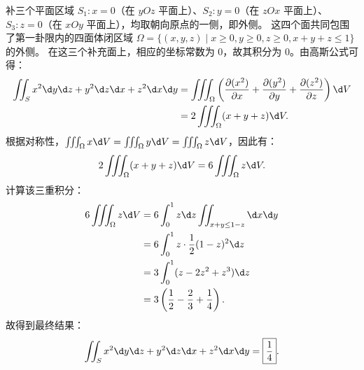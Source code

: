 \begin{solution}
    补三个平面区域 $S_1: x = 0$（在 $yOz$ 平面上）、$S_2: y = 0$（在 $zOx$ 平面上）、$S_3: z = 0$（在 $xOy$ 平面上），均取朝向原点的一侧，即外侧。
    这四个面共同包围了第一卦限内的四面体闭区域 $\Omega = \{ (x,y,z) \mid x \ge 0, y \ge 0, z \ge 0, x+y+z \le 1 \}$ 的外侧。
    在这三个补充面上，相应的坐标常数为 $0$，故其积分为 $0$。由高斯公式可得：
    \begin{equation}
        \label{eq:tetrahedron-1}
        \begin{aligned}
            \iint_{S} x^2 \d y \d z + y^2 \d z \d x + z^2 \d x \d y & = \iiint_{\Omega} \left( \frac{\partial(x^2)}{\partial x} + \frac{\partial(y^2)}{\partial y} + \frac{\partial(z^2)}{\partial z} \right) \d V \\
                                                                    & = 2 \iiint_{\Omega} (x + y + z) \d V.
        \end{aligned}
    \end{equation}
    根据对称性，$\iiint_{\Omega} x \d V = \iiint_{\Omega} y \d V = \iiint_{\Omega} z \d V$，因此有：
    \begin{equation}
        \label{eq:tetrahedron-2}
        2 \iiint_{\Omega} (x + y + z) \d V = 6 \iiint_{\Omega} z \d V.
    \end{equation}
    计算该三重积分：
    \begin{equation}
        \label{eq:tetrahedron-3}
        \begin{aligned}
            6 \iiint_{\Omega} z \d V & = 6 \int_0^1 z \d z \iint_{x+y \le 1-z} \d x \d y           \\
                                     & = 6 \int_0^1 z \cdot \frac{1}{2} (1 - z)^2 \d z             \\
                                     & = 3 \int_0^1 (z - 2z^2 + z^3) \d z                          \\
                                     & = 3 \left( \frac{1}{2} - \frac{2}{3} + \frac{1}{4} \right).
        \end{aligned}
    \end{equation}
    故得到最终结果：
    \begin{equation}
        \label{eq:tetrahedron-4}
        \iint_{S} x^2 \d y \d z + y^2 \d z \d x + z^2 \d x \d y = \boxed{\frac{1}{4}}.
    \end{equation}



\end{solution}
